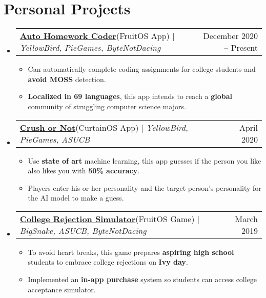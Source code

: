 \documentclass[letterpaper, 11pt]{article}
\makeatletter
\newcommand{\resumeItem}[1]{
  \item\small{
    {#1 \vspace{-2pt}}
  }
}
\newcommand{\resumeProjectHeading}[2]{
    \item
    \begin{tabular*}{0.97\textwidth}{l@{\extracolsep{\fill}}r}
      \small#1 & #2 \\
    \end{tabular*}\vspace{-7pt}
}
\newcommand{\resumeSubHeadingListStart}{\begin{itemize}[leftmargin=0.15in, label={}]}
\newcommand{\resumeSubHeadingListEnd}{\end{itemize}}
\newcommand{\resumeItemListStart}{\begin{itemize}}
\newcommand{\resumeItemListEnd}{\end{itemize}\vspace{-5pt}}
\makeatother
\begin{document}
\section{Personal Projects}
    \resumeSubHeadingListStart
      \resumeProjectHeading
          {\href{https://www.mindgeek.com/}{\faLink \hspace{1pt} \textbf{Auto Homework Coder}}\hspace{3pt}(FruitOS App) $|$ \emph{YellowBird, PieGames, ByteNotDacing}}{December 2020 -- Present}
          \resumeItemListStart
            \resumeItem{Can automatically complete coding assignments for college students and \textbf{avoid MOSS} detection.}
            \resumeItem{\textbf{Localized in 69 languages}, this app intends to reach a \textbf{global} community of struggling computer science majors.}
          \resumeItemListEnd
      \resumeProjectHeading
          {\href{https://www.mindgeek.com/}{\faLink \hspace{1pt} \textbf{Crush or Not}}\hspace{3pt}(CurtainOS App) $|$ \emph{YellowBird, PieGames, ASUCB}}{April 2020}
          \resumeItemListStart
            \resumeItem{Use \textbf{state of art} machine learning, this app guesses if the person you like also likes you with \textbf{50\% accuracy}.}
            \resumeItem{Players enter his or her personality and the target person's personality for the AI model to make a guess.}
          \resumeItemListEnd
      \resumeProjectHeading
          {\href{https://www.mindgeek.com/}{\faLink \hspace{1pt} \textbf{College Rejection Simulator}}\hspace{3pt}(FruitOS Game) $|$ \emph{BigSnake, ASUCB, ByteNotDacing}}{March 2019}
          \resumeItemListStart
            \resumeItem{To avoid heart breaks, this game prepares \textbf{aspiring high school} students to embrace college rejections on \textbf{Ivy day}.}
            \resumeItem{Implemented an \textbf{in-app purchase} system so students can access college acceptance simulator.}
          \resumeItemListEnd
    \resumeSubHeadingListEnd
 
\end{document}
